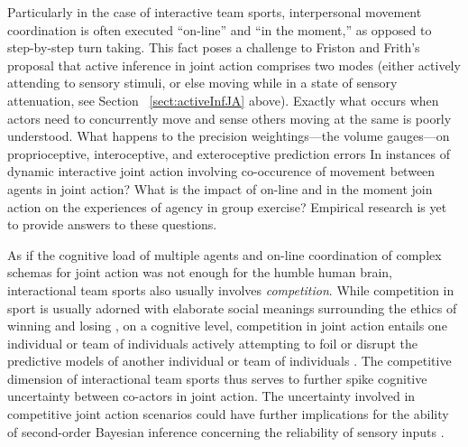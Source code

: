 \begin{CJK}{UTF8}{gbsn}
Particularly in the case of interactive team sports, interpersonal movement coordination is often executed ``on-line'' and ``in the moment,'' as opposed to step-by-step turn taking.  This fact poses a challenge to Friston and Frith's proposal that active inference in joint action comprises two modes (either actively attending to sensory stimuli, or else moving while in a state of sensory attenuation, see Section ~\ref{sect:activeInfJA} above).  Exactly what occurs when actors need to concurrently move and sense others moving at the same is poorly understood.  What happens to the precision weightings---the volume gauges---on proprioceptive, interoceptive, and exteroceptive prediction errors In instances of dynamic interactive joint action involving co-occurence of movement between agents in joint action?   What is the impact of on-line and in the moment join action on the experiences of agency in group exercise?  Empirical research is yet to provide answers to these questions.

As if the cognitive load of multiple agents and on-line coordination of complex schemas for joint action was not enough for the humble human brain, interactional team sports also usually involves \textit{competition}.  While competition in sport is usually adorned with elaborate social meanings surrounding the ethics of winning and losing \citep{McNamee2008}, on a cognitive level, competition in joint action entails one individual or team of individuals actively attempting to foil or disrupt the predictive models of another individual or team of individuals \citep{Reimer2006}.  The competitive dimension of interactional team sports thus serves to further spike cognitive uncertainty between co-actors in joint action.  The uncertainty involved in competitive joint action scenarios could have further implications for the ability of second-order Bayesian inference concerning the reliability of sensory inputs \citep{Pezzulo2014}.


\end{CJK}
